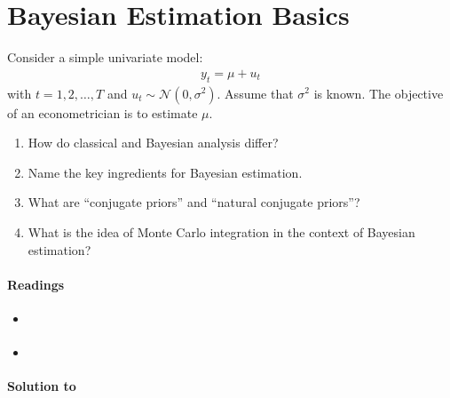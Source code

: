 \section[Bayesian Estimation Basics]{Bayesian Estimation Basics\label{ex:BayesianEstimationBasics}}
Consider a simple univariate model:
\begin{align*}
y_t = \mu + u_t
\end{align*}
with \(t = 1, 2,\ldots , T\) and \(u_t \sim \mathcal{N}(0,\sigma^2)\).
Assume that \(\sigma^2\) is known.
The objective of an econometrician is to estimate \(\mu \).
\begin{enumerate}
\item How do classical and Bayesian analysis differ?
\item Name the key ingredients for Bayesian estimation.
\item What are \enquote{conjugate priors} and \enquote{natural conjugate priors}?
\item What is the idea of Monte Carlo integration in the context of Bayesian estimation?
\end{enumerate}

\paragraph{Readings}
\begin{itemize}
\item \textcite[Part I]{Greenberg_2008_IntroductionBayesianEconometrics}
\item \textcite[Ch.1-2]{Koop_2003_BayesianEconometrics}
\end{itemize}

\begin{solution}\textbf{Solution to }
\ifDisplaySolutions%

\fi
\newpage
\end{solution}